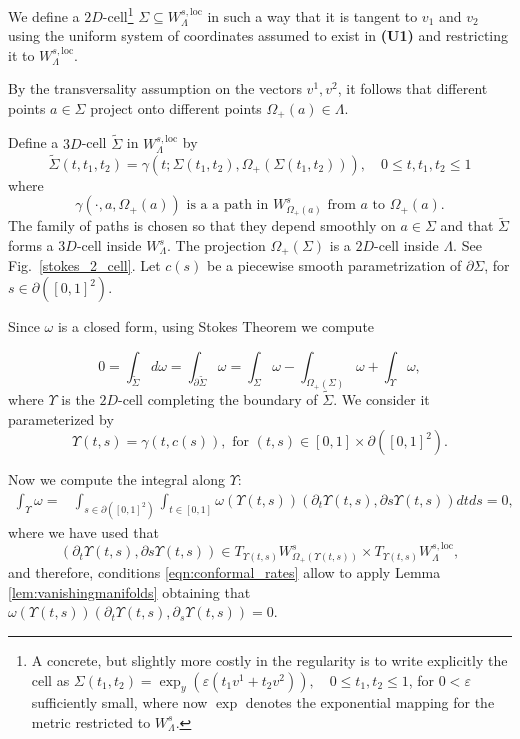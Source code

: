 \documentclass[11pt]{amsart}
\theoremstyle{definition}
\theoremstyle{remark}
\numberwithin{equation}{section}
\newcommand{\eps}{\varepsilon}
\begin{document}
We  define a $2D$-cell\footnote{A concrete, but slightly more costly
in the regularity  is to write explicitly the cell
as
$\Sigma( t_1,t_2)=\exp_y(\eps (t_1v^1+t_2v^2)),\quad 0\leq t_1,t_2\leq 1$,
for $0<\eps$ sufficiently small, where now $\exp$ denotes the exponential
mapping for the metric restricted to $W^s_\Lambda$.} $\Sigma\subseteq W^{s,\textrm{loc}}_\Lambda$
in such a way that it is tangent to  $v_1$ and
$v_2$ using the uniform system of coordinates  assumed
to exist in {\bf(U1)} and restricting it to
$W^{s,\mathrm{loc}}_\Lambda$.


By the transversality assumption on the vectors $v^1,v^2$,
it follows that different points $a\in  {\Sigma}$ project  onto different  points $\Omega_+(a)\in \Lambda$.

Define a $3D$-cell $\tilde{\Sigma}$ in $W^{s,\textrm{loc}}_\Lambda$ by
 \begin{equation}\label{eqn:3Dcell}
    \tilde{\Sigma}(t,t_1,t_2)=\gamma(t; \Sigma (t_1,t_2),\Omega_+(\Sigma(t_1,t_2))), \quad 0\leq t, t_1,t_2\leq 1
 \end{equation}
where
\begin{equation}
\label{eqn:gamma_def}
\gamma(\cdot, a,\Omega_+(a)) \textrm{ is a   a path in } W^s_{\Omega_+(a)}\textrm{ from } a \textrm{ to }\Omega_+(a) .
\end{equation}
The family of paths is chosen so that they depend smoothly on $a\in  \Sigma$ and
that $\tilde{\Sigma}$ forms  a   $3D$-cell inside  $W^s_\Lambda$.
The projection $\Omega_+(\Sigma)$ is a $2D$-cell inside $\Lambda$.
See Fig.~\ref{stokes_2_cell}.
Let $c(s)$ be a piecewise smooth parametrization of $\partial  \Sigma$, for $s\in\partial([0,1]^2)$.




Since $\omega$ is a closed form, using Stokes Theorem  we   compute

\begin{equation}\label{Stokes}
0=\int_{\tilde{\Sigma}} d\omega =
\int_{\partial \tilde{\Sigma}}\omega =
\int_\Sigma \omega-\int_{\Omega_+(\Sigma)}\omega+\int_\Upsilon \omega,
\end{equation}
where $\Upsilon$ is the $2D$-cell completing the boundary of $\tilde\Sigma$.
We consider it parameterized by
\[
\Upsilon(t,s)=\gamma(t,c(s)),\textrm{ for } (t,s) \in [0,1]\times \partial([0,1]^2).
\]


Now we compute the integral along $\Upsilon$:
\[\begin{split}
\int_\Upsilon \omega=&\int _{s\in \partial([0,1]^2) }\int _{t\in[ 0,1] }\omega (\Upsilon(t,s)) (\partial _t \Upsilon(t,s), \partial s\Upsilon(t,s))dt ds=0,
\end{split}
\]
where we have used that
\[
\left(\partial _t \Upsilon(t,s), \partial s\Upsilon(t,s)\right) \in T_{ \Upsilon(t,s)   }W^s_{\Omega_+(\Upsilon(t,s))} \times T_{ \Upsilon(t,s)   } W^{s,\mathrm{loc}}_\Lambda ,
\]
and therefore, conditions \eqref{eqn:conformal_rates} allow to apply Lemma \ref{lem:vanishingmanifolds} obtaining that  $\omega (\Upsilon(t,s)) (\partial _t \Upsilon(t,s), \partial_s\Upsilon(t,s))=0$.
\end{document}
